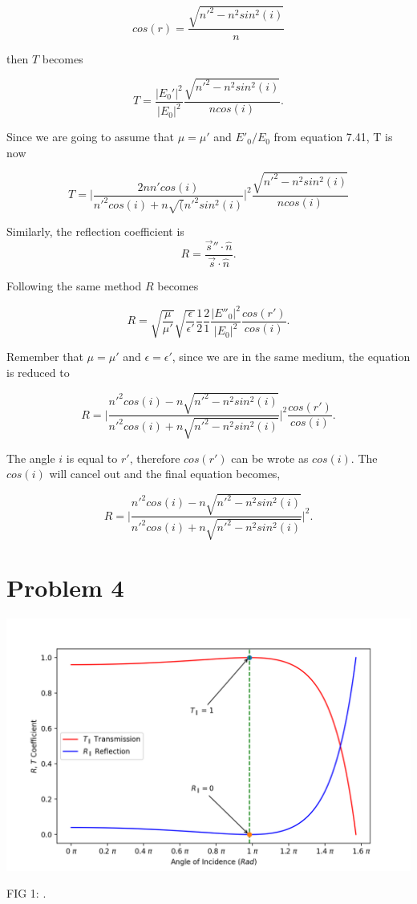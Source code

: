 \documentclass[11pt]{article}
\begin{document}
$$
cos(r) = \frac{\sqrt{n'^{2} - n^{2}sin^{2}(i)}}{n}
$$

then $T$ becomes 

$$
T = \frac{|E_{0}'|^{2}}{|E_{0}|^{2}} \frac{\sqrt{n'^{2} - n^{2}sin^{2}(i)}}{ncos(i)}.
$$

Since we are going to assume that $\mu = \mu'$ and $E'_{0}/E_{0}$ from equation 7.41, T is now 

$$
T = \Bigg|\frac{2nn'cos(i)}{n'^{2}cos(i) + n\sqrt(n'^{2}sin^{2}(i)}\Bigg|^{2}\frac{\sqrt{n'^{2} - n^{2}sin^{2}(i)}}{ncos(i)}
$$

Similarly, the reflection coefficient is 
$$
R = \frac{\vec{s}'' \cdot \hat{n}}{\vec{s} \cdot \hat{n}}.
$$

Following the same method $R$ becomes

$$
R = \sqrt{\frac{\mu}{\mu'}} \sqrt{\frac{\epsilon}{\epsilon'}} \frac{1}{2} \frac{2}{1} \frac{|E''_{0}|^{2}}{|E_{0}|^{2}} \frac{cos(r')}{cos(i)}.
$$


Remember that $\mu = \mu'$ and $\epsilon = \epsilon'$, since we are in the same medium, the equation is reduced to

$$
R =\Bigg|\frac{n'^{2}cos(i)-n\sqrt{n'^{2}-n^{2}sin^{2}(i)}}{n'^{2}cos(i)+n\sqrt{n'^{2}-n^{2}sin^{2}(i)}}\Bigg|^{2} \frac{cos(r')}{cos(i)}.
$$

The angle $i$ is equal to $r'$, therefore $cos(r')$ can be wrote as $cos(i)$. The $cos(i)$ will cancel out and the final equation becomes,

$$
R =\Bigg|\frac{n'^{2}cos(i)-n\sqrt{n'^{2}-n^{2}sin^{2}(i)}}{n'^{2}cos(i)+n\sqrt{n'^{2}-n^{2}sin^{2}(i)}}\Bigg|^{2}.
$$

\clearpage

\section*{Problem 4}

\begin{center}
    \includegraphics[width=1.0\textwidth]{t_r_plot.png}
    \caption{\small FIG 1: .}
\end{center}
\end{document}
